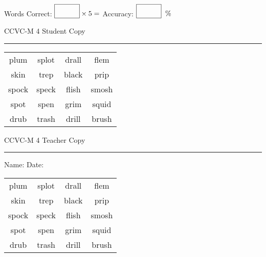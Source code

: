 \documentclass{memoir}
\begin{document}
\small

Words Correct: $\fbox{\phantom{\huge 100}} \times 5 = $ Accuracy: $\fbox{\phantom{\huge 100}}\;\; \%$ 

\vfill

\newpage


\footnotesize \noindent
CCVC-M 4 \hfill Student Copy
\smallskip
\hrule

\Large

\setlength{\tabcolsep}{14pt}
\def\arraystretch{3}

{\selectfont


\begin{vplace}[0.5]
\begin{center}
\begin{tabular}{cccc}
plum & splot & drall & flem \\
skin & trep & black            & prip \\
spock & speck & flish             & smosh \\
spot & spen & grim       & squid \\
drub             & trash & drill & brush \\
\end{tabular}
\end{center}
\end{vplace}

}

\newpage

\footnotesize \noindent
CCVC-M 4 \hfill Teacher Copy
\smallskip
\hrule

\small

\vfill

\noindent
Name: \underline{\hspace{1.75in}} \hfill Date: \underline{\hspace{1in}}

\Large

{\selectfont


\begin{vplace}[0.5]
\begin{center}
\begin{tabular}{cccc}
plum & splot & drall & flem \\
skin & trep & black            & prip \\
spock & speck & flish             & smosh \\
spot & spen & grim       & squid \\
drub             & trash & drill & brush \\
\end{tabular}
\end{center}
\end{vplace}



}
\end{document}
